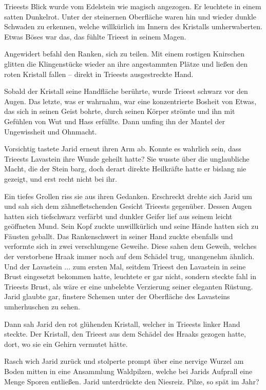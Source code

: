 Trieests Blick wurde vom Edelstein wie magisch angezogen. Er leuchtete in einem satten Dunkelrot. Unter der steinernen Oberfläche waren hin und wieder dunkle Schwaden zu erkennen, welche willkürlich im Innern des Kristalls umherwaberten. Etwas Böses war das, das fühlte Trieest in seinem Magen.

Angewidert befahl den Ranken, sich zu teilen. Mit einem rostigen Knirschen glitten die Klingenstücke wieder an ihre angestammten Plätze und ließen den roten Kristall fallen – direkt in Trieests ausgestreckte Hand.

Sobald der Kristall seine Handfläche berührte, wurde Trieest schwarz vor den Augen. Das letzte, was er wahrnahm, war eine konzentrierte Bosheit von Etwas, das sich in seinen Geist bohrte, durch seinen Körper strömte und ihn mit Gefühlen von Wut und Hass erfüllte. Dann umfing ihn der Mantel der Ungewissheit und Ohnmacht.\bigskip







Vorsichtig tastete Jarid erneut ihren Arm ab. Konnte es wahrlich sein, dass Trieests Lavastein ihre Wunde geheilt hatte? Sie wusste über die unglaubliche Macht, die der Stein barg, doch derart direkte Heilkräfte hatte er bislang nie gezeigt, und erst recht nicht bei ihr.

Ein tiefes Grollen riss sie aus ihren Gedanken. Erschreckt drehte sich Jarid um und sah sich dem zähnefletschenden Gesicht Trieests gegenüber. Dessen Augen hatten sich tiefschwarz verfärbt und dunkler Geifer lief aus seinem leicht geöffneten Mund. Sein Kopf zuckte unwillkürlich und seine Hände hatten sich zu Fäusten geballt. Das Rankenschwert in seiner Hand zuckte ebenfalls und verformte sich in zwei verschlungene Geweihe. Diese sahen dem Geweih, welches der verstorbene Hraak immer noch auf dem Schädel trug, unangenehm ähnlich. Und der Lavastein ... zum ersten Mal, seitdem Trieest den Lavastein in seine Brust eingesetzt bekommen hatte, leuchtete er gar nicht, sondern steckte fahl in Trieests Brust, als wäre er eine unbelebte Verzierung seiner eleganten Rüstung. Jarid glaubte gar, finstere Schemen unter der Oberfläche des Lavasteins umherhuschen zu sehen.

Dann sah Jarid den rot glühenden Kristall, welcher in Trieests linker Hand steckte. Der Kristall, den Trieest aus dem Schädel des Hraaks gezogen hatte, dort, wo sie ein Gehirn vermutet hätte.

Rasch wich Jarid zurück und stolperte prompt über eine nervige Wurzel am Boden mitten in eine Ansammlung Waldpilzen, welche bei Jarids Aufprall eine Menge Sporen entließen. Jarid unterdrückte den Niesreiz. Pilze, so spät im Jahr?


